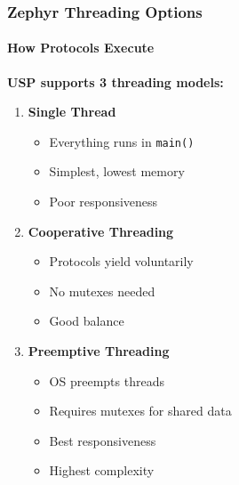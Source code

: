 \documentclass{beamer}
\begin{document}
\begin{frame}
\frametitle{Zephyr Threading Options}
\framesubtitle{How Protocols Execute}

\textbf{USP supports 3 threading models:}

\begin{enumerate}
    \item \textbf{Single Thread}
    \begin{itemize}
        \item Everything runs in \texttt{main()}
        \item Simplest, lowest memory
        \item Poor responsiveness
    \end{itemize}

    \item \textbf{Cooperative Threading}
    \begin{itemize}
        \item Protocols yield voluntarily
        \item No mutexes needed
        \item Good balance
    \end{itemize}

    \item \textbf{Preemptive Threading}
    \begin{itemize}
        \item OS preempts threads
        \item Requires mutexes for shared data
        \item Best responsiveness
        \item Highest complexity
    \end{itemize}
\end{enumerate}
\end{frame}
\end{document}
